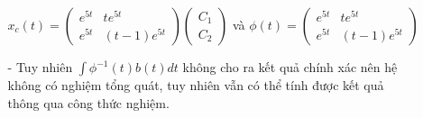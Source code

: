 \documentclass[a4paper]{article}
\begin{document}
\begin{enumerate}
\begin{itemize}
        \begin{center}
            $x_c(t) = \left( \begin{matrix} e^{5t} & te^{5t} \\ e^{5t} & (t-1)e^{5t} \end{matrix} \right) \left( \begin{matrix} C_1 \\ C_2 \end{matrix} \right)$ và $\phi(t) = \left( \begin{matrix} e^{5t} & te^{5t} \\ e^{5t} & (t-1)e^{5t} \end{matrix} \right)$
        \end{center}
    \item[-] Tuy nhiên $\int\phi^{-1}(t)b(t)dt$ không cho ra kết quả chính xác nên hệ không có nghiệm tổng quát, tuy nhiên vẫn có thể tính được kết quả thông qua công thức nghiệm.
    \end{itemize}
\end{enumerate}
\end{document}
